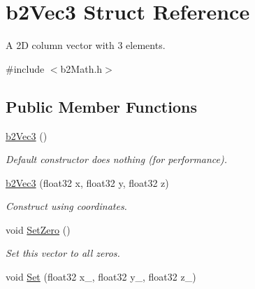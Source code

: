 \hypertarget{structb2_vec3}{\section{b2\-Vec3 Struct Reference}
\label{structb2_vec3}
}


A 2\-D column vector with 3 elements.  




{\ttfamily \#include $<$b2\-Math.\-h$>$}

\subsection*{Public Member Functions}
\begin{DoxyCompactItemize}
\item 
\hypertarget{structb2_vec3_a837423f66d6fb72d815e7390c09938b9}{\hyperlink{structb2_vec3_a837423f66d6fb72d815e7390c09938b9}{b2\-Vec3} ()}\label{structb2_vec3_a837423f66d6fb72d815e7390c09938b9}

\begin{DoxyCompactList}\small\item\em Default constructor does nothing (for performance). \end{DoxyCompactList}\item 
\hypertarget{structb2_vec3_a47df55b26ab254dcf42a16638c7feeeb}{\hyperlink{structb2_vec3_a47df55b26ab254dcf42a16638c7feeeb}{b2\-Vec3} (float32 x, float32 y, float32 z)}\label{structb2_vec3_a47df55b26ab254dcf42a16638c7feeeb}

\begin{DoxyCompactList}\small\item\em Construct using coordinates. \end{DoxyCompactList}\item 
\hypertarget{structb2_vec3_a5a459ed49f1910a347ca247f848a2dd8}{void \hyperlink{structb2_vec3_a5a459ed49f1910a347ca247f848a2dd8}{Set\-Zero} ()}\label{structb2_vec3_a5a459ed49f1910a347ca247f848a2dd8}

\begin{DoxyCompactList}\small\item\em Set this vector to all zeros. \end{DoxyCompactList}\item 
\hypertarget{structb2_vec3_a12a1bc14bbe722dfb175a492d2d00a79}{void \hyperlink{structb2_vec3_a12a1bc14bbe722dfb175a492d2d00a79}{Set} (float32 x\-\_\-, float32 y\-\_\-, float32 z\-\_\-)}\label{structb2_vec3_a12a1bc14bbe722dfb175a492d2d00a79}


\end{DoxyCompactItemize}
